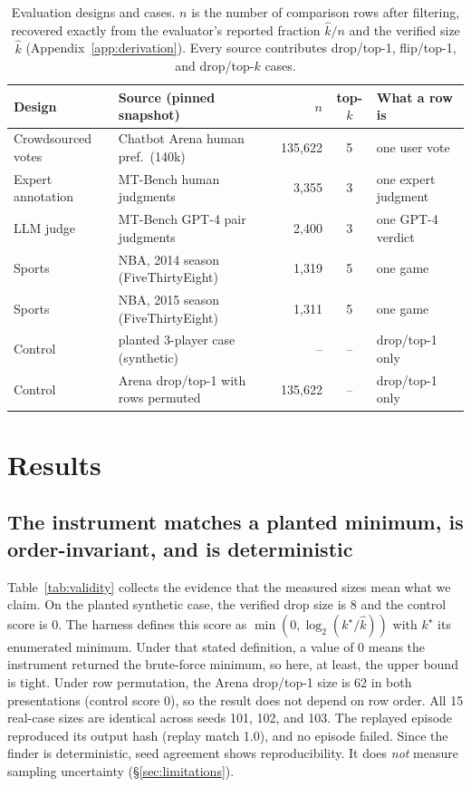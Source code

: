 \documentclass{article}
\newcommand{\kver}{\hat{k}}
\begin{document}
\begin{table}[t]
\centering
\caption{Evaluation designs and cases. $n$ is the number of comparison rows after filtering, recovered exactly from the evaluator's reported fraction $\kver/n$ and the verified size $\kver$ (Appendix~\ref{app:derivation}). Every source contributes drop/top-1, flip/top-1, and drop/top-$k$ cases.}
\label{tab:cases}
\small
\begin{tabular}{@{}llrcl@{}}
\toprule
Design & Source (pinned snapshot) & $n$ & top-$k$ & What a row is \\
\midrule
Crowdsourced votes & Chatbot Arena human pref.\ (140k) & 135{,}622 & 5 & one user vote \\
Expert annotation & MT-Bench human judgments & 3{,}355 & 3 & one expert judgment \\
LLM judge & MT-Bench GPT-4 pair judgments & 2{,}400 & 3 & one GPT-4 verdict \\
Sports & NBA, 2014 season (FiveThirtyEight) & 1{,}319 & 5 & one game \\
Sports & NBA, 2015 season (FiveThirtyEight) & 1{,}311 & 5 & one game \\
\midrule
Control & planted 3-player case (synthetic) & -- & -- & drop/top-1 only \\
Control & Arena drop/top-1 with rows permuted & 135{,}622 & -- & drop/top-1 only \\
\bottomrule
\end{tabular}
\end{table}

\section{Results}
\label{sec:results}

\subsection{The instrument matches a planted minimum, is order-invariant, and is deterministic}
\label{sec:res-validity}

Table~\ref{tab:validity} collects the evidence that the measured sizes mean what we claim. On the planted synthetic case, the verified drop size is 8 and the control score is 0. The harness defines this score as $\min(0,\log_2(k^\star/\kver))$ with $k^\star$ its enumerated minimum. Under that stated definition, a value of 0 means the instrument returned the brute-force minimum, so here, at least, the upper bound is tight. Under row permutation, the Arena drop/top-1 size is 62 in both presentations (control score 0), so the result does not depend on row order. All 15 real-case sizes are identical across seeds 101, 102, and 103. The replayed episode reproduced its output hash (replay match 1.0), and no episode failed. Since the finder is deterministic, seed agreement shows reproducibility. It does \emph{not} measure sampling uncertainty (\S\ref{sec:limitations}).
\end{document}
